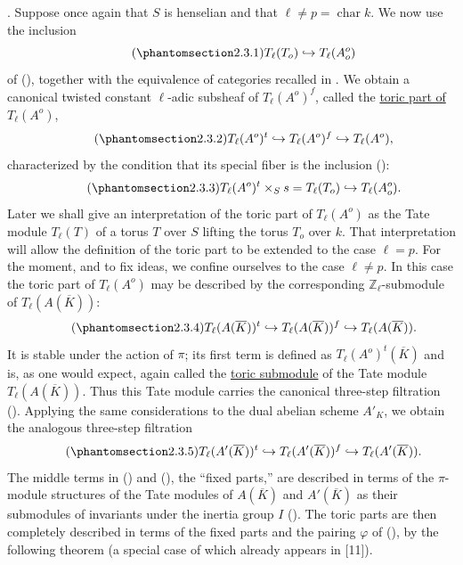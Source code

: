 
\medskip
\noindent
{}. Suppose once again that $S$ is henselian and that
$\ell\ne p=\operatorname{char}k$.  We now use the inclusion
\begin{equation}\tag{\SGARefTarget{sga7.sga7i.eix.n2-3-1}{2.3.1}}
 T_\ell(T_o)\hookrightarrow T_\ell(A_o^o)
\end{equation}
of (), together with the equivalence of categories recalled in
.  We obtain a canonical twisted constant $\ell$-adic subsheaf
of $T_\ell(A^o)^f$, called the \underline{toric part of}
$T_\ell(A^o)$,
\begin{equation}\tag{\SGARefTarget{sga7.sga7i.eix.n2-3-2}{2.3.2}}
 T_\ell(A^o)^t\hookrightarrow T_\ell(A^o)^f
 \hookrightarrow T_\ell(A^o),
\end{equation}
characterized by the condition that its special fiber is the inclusion
():
\begin{equation}\tag{\SGARefTarget{sga7.sga7i.eix.n2-3-3}{2.3.3}}
 T_\ell(A^o)^t\times_Ss=T_\ell(T_o)
 \hookrightarrow T_\ell(A_o^o).
\end{equation}
Later we shall give an interpretation of the toric part of
$T_\ell(A^o)$ as the Tate module $T_\ell(T)$ of a torus $T$ over $S$
lifting the torus $T_o$ over $k$.  That interpretation will allow the
definition of the toric part to be extended to the case $\ell=p$.
For the moment, and to fix ideas, we confine ourselves to the case
$\ell\ne p$.  In this case the toric part of $T_\ell(A^o)$ may be
described by the corresponding $\mathbb Z_\ell$-submodule of
$T_\ell(A(\overline K))$:
\begin{equation}\tag{\SGARefTarget{sga7.sga7i.eix.n2-3-4}{2.3.4}}
 T_\ell(A(\overline K))^t\hookrightarrow
 T_\ell(A(\overline K))^f\hookrightarrow
 T_\ell(A(\overline K)).
\end{equation}
It is stable under the action of $\pi$; its first term is defined as
$T_\ell(A^o)^t(\overline K)$ and is, as one would expect, again called
the \underline{toric submodule} of the Tate module
$T_\ell(A(\overline K))$.  Thus this Tate module carries the canonical
three-step filtration ().  Applying the same considerations to
the dual abelian scheme $A'_K$, we obtain the analogous three-step
filtration
\begin{equation}\tag{\SGARefTarget{sga7.sga7i.eix.n2-3-5}{2.3.5}}
 T_\ell(A'(\overline K))^t\hookrightarrow
 T_\ell(A'(\overline K))^f\hookrightarrow
 T_\ell(A'(\overline K)).
\end{equation}
The middle terms in () and (), the ``fixed parts,'' are
described in terms of the $\pi$-module structures of the Tate modules
of $A(\overline K)$ and $A'(\overline K)$ as their submodules of
invariants under the inertia group $I$ ().  The toric parts are
then completely described in terms of the fixed parts and the pairing
$\varphi$ of (), by the following theorem (a special case of which
already appears in [11]).

